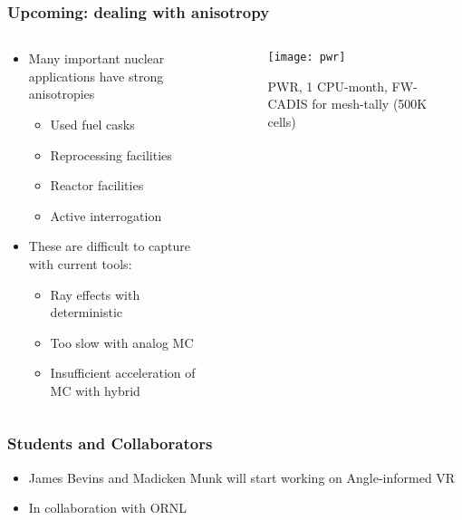 \documentclass[xcolor=x11names,compress]{beamer}
\renewcommand{\(}{\begin{columns}}
\renewcommand{\)}{\end{columns}}
\newcommand{\<}[1]{\begin{column}{#1}}
\renewcommand{\>}{\end{column}}
\begin{document}
\begin{frame}[fragile]
  \frametitle{Upcoming: dealing with anisotropy}

	\begin{columns}
  	\begin{column}{0.5\textwidth}
	\begin{itemize}
	\item Many important nuclear applications have strong anisotropies
	 \begin{itemize}
	 \item Used fuel casks
	 \item Reprocessing facilities
	 \item Reactor facilities
	 \item Active interrogation 
	 \end{itemize}
	\item These are difficult to capture with current tools:
	 \begin{itemize}
	 \item Ray effects with deterministic
	 \item Too slow with analog MC
	 \item Insufficient acceleration of MC with hybrid
	 \end{itemize}
	\end{itemize}
  	\end{column}
 	\begin{column}{0.5\textwidth}
 	 \begin{center}
 	 \begin{figure}
 	 \texttt{[image: pwr]}  
 	 \caption{PWR, 1 CPU-month, FW-CADIS  for mesh-tally (500K cells)}
 	 \end{figure}
 	 \end{center}

  	\end{column}
	\end{columns}

\end{frame}

\begin{frame}[fragile]
  \frametitle{Students and Collaborators}

	\begin{itemize}
	  \item James Bevins and Madicken Munk will start working on Angle-informed VR
	  \item In collaboration with ORNL
	\end{itemize}

\end{frame}
\end{document}
